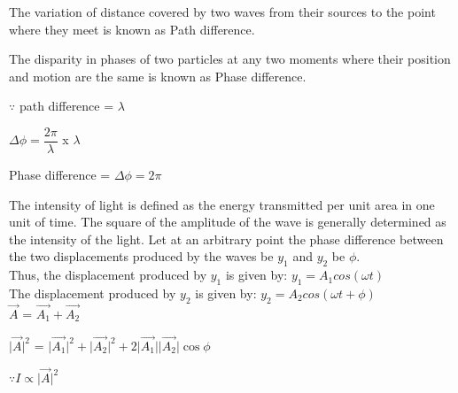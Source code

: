 \documentclass[journal,12pt,twocolumn]{IEEEtran}
\theoremstyle{remark}
\begin{document}
\vspace{0.2cm}

The variation of distance covered by two waves from their sources to the point where they meet is known as Path difference.

The disparity in phases of two particles at any two moments where their position and motion are the same is known as Phase difference.

$\because$ path difference = $\lambda$

\vspace{0.2cm}

\hspace{1cm}$\Delta \phi = \dfrac{2\pi}{\lambda}$  x  $\lambda$

\vspace{0.2cm}

Phase difference = $\Delta \phi = 2\pi$


      \vspace{0.2cm}

The intensity of light is defined as the energy transmitted per unit area in one unit of time. The square of the amplitude of the wave is generally determined as the intensity of the light. 
Let at an arbitrary point the phase difference between the two displacements produced by the waves be $y_1$ and $y_2$ be $\phi$.\\
Thus, the displacement produced by $y_1$ is given by:
\hspace*{1cm} $y_1 = A_1cos(\omega t )$ \\
The displacement produced by $y_2$ is given by:
\hspace*{1cm} $y_2 = A_2cos(\omega t + \phi)$ \\

\hspace*{1.8cm}$ \overrightarrow{A}$ = $\overrightarrow{A_1} + \overrightarrow{A_2}$ 

\vspace{0.2cm}

\hspace*{0.9cm}$\lvert \overrightarrow{A} \rvert^2$ = $\lvert\overrightarrow{A_1}\rvert^2 +\lvert \overrightarrow{A_2}\rvert^2 + 2\lvert\overrightarrow{A_1}\rvert\lvert\overrightarrow{A_2}\rvert \cos \phi$

\vspace{0.2cm}

\hspace*{1cm}$\because I \propto \lvert\overrightarrow{A}\rvert^2$

\vspace{0.2cm}
\end{document}
